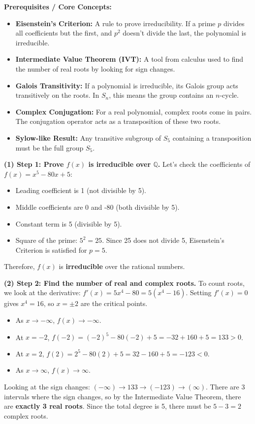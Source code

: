 \begin{solution}
\textbf{Prerequisites / Core Concepts:}
\begin{itemize}
    \item \textbf{Eisenstein's Criterion:} A rule to prove irreducibility. If a prime $p$ divides all coefficients but the first, and $p^2$ doesn't divide the last, the polynomial is irreducible.
    \item \textbf{Intermediate Value Theorem (IVT):} A tool from calculus used to find the number of real roots by looking for sign changes.
    \item \textbf{Galois Transitivity:} If a polynomial is irreducible, its Galois group acts transitively on the roots. In $S_n$, this means the group contains an $n$-cycle.
    \item \textbf{Complex Conjugation:} For a real polynomial, complex roots come in pairs. The conjugation operator acts as a transposition of these two roots.
    \item \textbf{Sylow-like Result:} Any transitive subgroup of $S_5$ containing a transposition must be the full group $S_5$.
\end{itemize}

\textbf{(1) Step 1: Prove $f(x)$ is irreducible over $\mathbb{Q}$.}
Let's check the coefficients of $f(x) = x^5 - 80x + 5$:
\begin{itemize}
    \item Leading coefficient is 1 (not divisible by 5).
    \item Middle coefficients are 0 and -80 (both divisible by 5).
    \item Constant term is 5 (divisible by 5).
    \item Square of the prime: $5^2 = 25$. Since 25 does not divide 5, Eisenstein's Criterion is satisfied for $p=5$.
\end{itemize}
Therefore, $f(x)$ is \textbf{irreducible} over the rational numbers.

\textbf{(2) Step 2: Find the number of real and complex roots.}
To count roots, we look at the derivative: $f'(x) = 5x^4 - 80 = 5(x^4 - 16)$.
Setting $f'(x) = 0$ gives $x^4 = 16$, so $x = \pm 2$ are the critical points.
\begin{itemize}
    \item As $x \to -\infty$, $f(x) \to -\infty$.
    \item At $x = -2$, $f(-2) = (-2)^5 - 80(-2) + 5 = -32 + 160 + 5 = 133 > 0$.
    \item At $x = 2$, $f(2) = 2^5 - 80(2) + 5 = 32 - 160 + 5 = -123 < 0$.
    \item As $x \to \infty$, $f(x) \to \infty$.
\end{itemize}
Looking at the sign changes: $(-\infty) \to 133 \to (-123) \to (\infty)$.
There are 3 intervals where the sign changes, so by the Intermediate Value Theorem, there are \textbf{exactly 3 real roots}.
Since the total degree is 5, there must be $5 - 3 = 2$ complex roots.


\end{solution}
